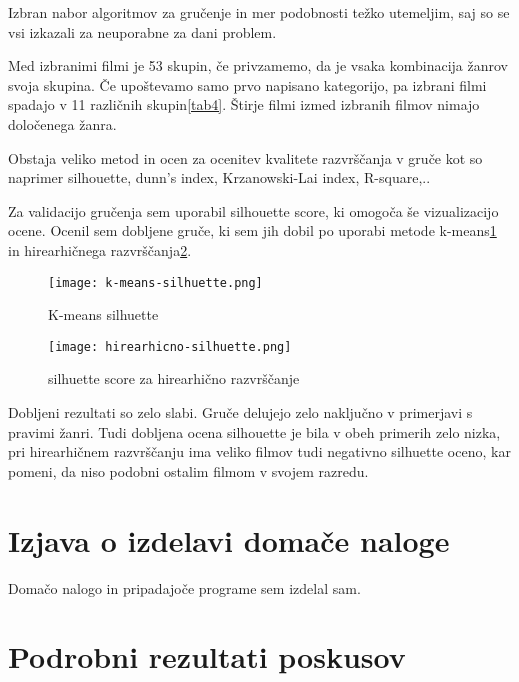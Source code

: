 \documentclass[a4paper,11pt]{article}
\begin{document}
Izbran nabor algoritmov za gručenje in mer podobnosti težko utemeljim, saj so se vsi izkazali za neuporabne za dani problem.

Med izbranimi filmi je 53 skupin, če privzamemo, da je vsaka kombinacija žanrov svoja skupina. Če upoštevamo samo prvo napisano kategorijo, pa izbrani filmi spadajo v 11 različnih skupin\ref{tab4}. Štirje filmi izmed izbranih filmov nimajo določenega žanra.

Obstaja veliko metod in ocen za ocenitev kvalitete razvrščanja v gruče kot so naprimer silhouette, dunn's index, Krzanowski-Lai index, R-square,..

Za validacijo gručenja sem uporabil silhouette score, ki omogoča še vizualizacijo ocene. Ocenil sem dobljene gruče, ki sem jih dobil po uporabi metode k-means\ref{slika5} in hirearhičnega razvrščanja\ref{slika6}.



\begin{figure}[htbp]
\begin{center}
\texttt{[image: k-means-silhuette.png]}
\caption{K-means silhuette}
\label{slika5}
\end{center}
\end{figure}

\begin{figure}[htbp]
\begin{center}
\texttt{[image: hirearhicno-silhuette.png]}
\caption{silhuette score za hirearhično razvrščanje}
\label{slika6}
\end{center}
\end{figure}


Dobljeni rezultati so zelo slabi. Gruče delujejo zelo naključno v primerjavi s pravimi žanri. Tudi dobljena ocena silhouette je bila v obeh primerih zelo nizka, pri hirearhičnem razvrščanju ima veliko filmov tudi negativno silhuette oceno, kar pomeni, da niso podobni ostalim filmom v svojem razredu.

\section{Izjava o izdelavi domače naloge}
Domačo nalogo in pripadajoče programe sem izdelal sam.

\appendix
\appendixpage
\section{\label{app-res}Podrobni rezultati poskusov}
\end{document}
